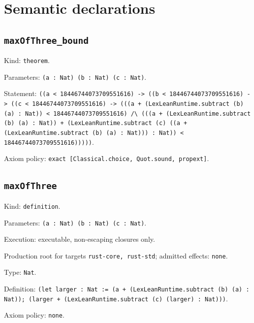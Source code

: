 \documentclass[11pt]{article}
\begin{document}
\section*{Semantic declarations}
\subsection*{\texttt{maxOfThree\_bound}}
\noindent Kind: \texttt{theorem}.\par
\noindent Parameters: \texttt{(a : Nat) (b : Nat) (c : Nat)}.\par
\noindent Statement: \texttt{((a < 18446744073709551616) -> ((b < 18446744073709551616) -> ((c < 18446744073709551616) -> (((a + (LexLeanRuntime.subtract (b) (a) : Nat)) < 18446744073709551616) /\textbackslash{} (((a + (LexLeanRuntime.subtract (b) (a) : Nat)) + (LexLeanRuntime.subtract (c) ((a + (LexLeanRuntime.subtract (b) (a) : Nat))) : Nat)) < 18446744073709551616)))))}.\par
\noindent Axiom policy: \texttt{exact [Classical.choice, Quot.sound, propext]}.\par
\subsection*{\texttt{maxOfThree}}
\noindent Kind: \texttt{definition}.\par
\noindent Parameters: \texttt{(a : Nat) (b : Nat) (c : Nat)}.\par
\noindent Execution: executable, non-escaping closures only.\par
\noindent Production root for targets \texttt{rust-core, rust-std}; admitted effects: \texttt{none}.\par
\noindent Type: \texttt{Nat}.\par
\noindent Definition: \texttt{(let larger : Nat := (a + (LexLeanRuntime.subtract (b) (a) : Nat)); (larger + (LexLeanRuntime.subtract (c) (larger) : Nat)))}.\par
\noindent Axiom policy: \texttt{none}.\par
\end{document}
